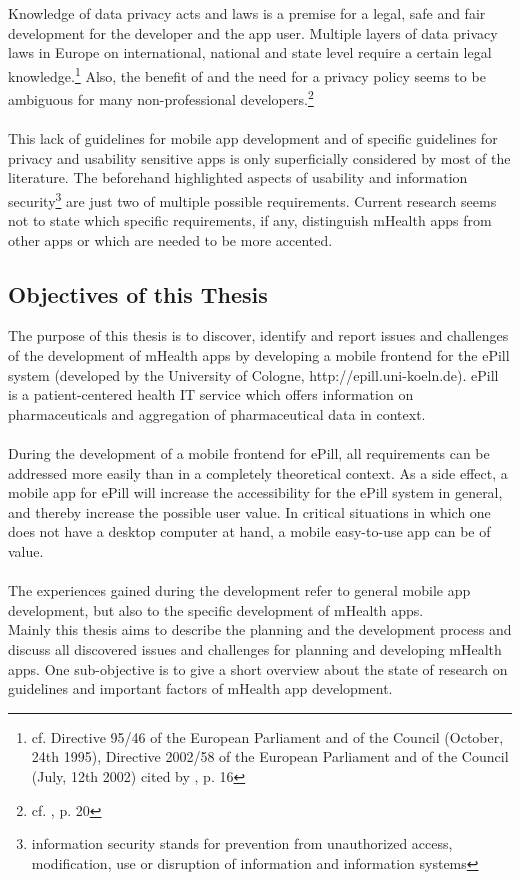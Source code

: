 \\
\\
Knowledge of data privacy acts and laws is a premise for a legal, safe and fair development for the developer and the app user. Multiple layers of data privacy laws in Europe on international, national and state level require a certain legal knowledge.\footnote{cf. Directive 95/46 of the European Parliament and of the Council (October, 24th 1995), Directive 2002/58 of the European Parliament and of the Council (July, 12th 2002) cited by \cite{FutureofPrivacyForumCenterforDemocracy&Technology.2011}, p. 16} Also, the benefit of and the need for a privacy policy seems to be ambiguous for many non-professional developers.\footnote{cf. \cite{Njie.2013}, p. 20}
\\
\\
This lack of guidelines for mobile app development and of specific guidelines for privacy and usability sensitive apps is only superficially considered by most of the literature. The beforehand highlighted aspects of usability and information security\footnote{information security stands for prevention from unauthorized access, modification, use or disruption of information and information systems} are just two of multiple possible requirements. Current research seems not to state which specific requirements, if any, distinguish mHealth apps from other apps or which are needed to be more accented.

\subsection{Objectives of this Thesis}
The purpose of this thesis is to discover, identify and report issues and challenges of the development of mHealth apps by developing a mobile frontend for the ePill system (developed by the University of Cologne, http://epill.uni-koeln.de). ePill is a patient-centered health IT service which offers information on pharmaceuticals and aggregation of pharmaceutical data in context.
\\
\\
During the development of a mobile frontend for ePill, all requirements can be addressed more easily than in a completely theoretical context. As a side effect, a mobile app for ePill will increase the accessibility for the ePill system in general, and thereby increase the possible user value. In critical situations in which one does not have a desktop computer at hand, a mobile easy-to-use app can be of value.
\\
\\
The experiences gained during the development refer to general mobile app development, but also to the specific development of mHealth apps.
\\
Mainly this thesis aims to describe the planning and the development process and discuss all discovered issues and challenges for planning and developing mHealth apps. One sub-objective is to give a short overview about the state of research on guidelines and important factors of mHealth app development. 